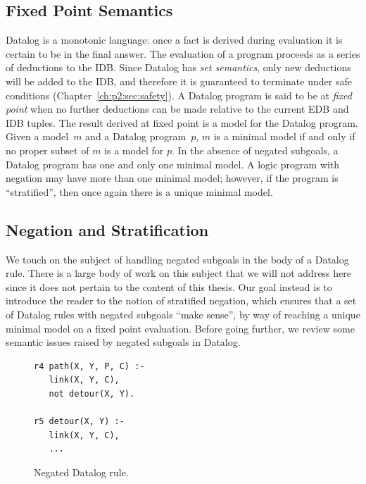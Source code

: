 \subsection{Fixed Point Semantics}

Datalog is a monotonic language: once a fact is derived during evaluation it is
certain to be in the final answer.  The evaluation of a program proceeds as a
series of deductions to the IDB.  Since Datalog has {\em set semantics}, only
new deductions will be added to the IDB, and therefore it is guaranteed to
terminate under safe conditions (Chapter~\ref{ch:p2:sec:safety}).  A Datalog
program is said to be at {\em fixed point} when no further deductions can be
made relative to the current EDB and IDB tuples.  The result derived at fixed
point is a model for the Datalog program.  Given a model~$m$ and a Datalog
program~$p$, $m$ is a minimal model if and only if no proper subset of
$m$ is a model for $p$.  In the absence of negated subgoals, a Datalog program
has one and only one minimal model.  A logic program with negation may have
more than one minimal model; however, if the program is ``stratified'', then once
again there is a unique minimal model.~\cite{ullmanbook}


\subsection{Negation and Stratification}

We touch on the subject of handling negated subgoals in the body of a Datalog
rule.  There is a large body of work on this subject that we will not address
here since it does not pertain to the content of this thesis.  Our goal instead
is to introduce the reader to the notion of stratified negation, which ensures
that a set of Datalog rules with negated subgoals ``make sense'', by way of
reaching a unique minimal model on a fixed point evaluation.  Before going
further, we review some semantic issues raised by negated subgoals in Datalog.

\begin{figure}
\centering
\ssp
\begin{lstlisting}
r4 path(X, Y, P, C) :-
   link(X, Y, C),
   not detour(X, Y).

r5 detour(X, Y) :-
   link(X, Y, C),
   ... 
\end{lstlisting}
\caption{\label{ch:p2:fig:negation}Negated Datalog rule.}
\end{figure}

